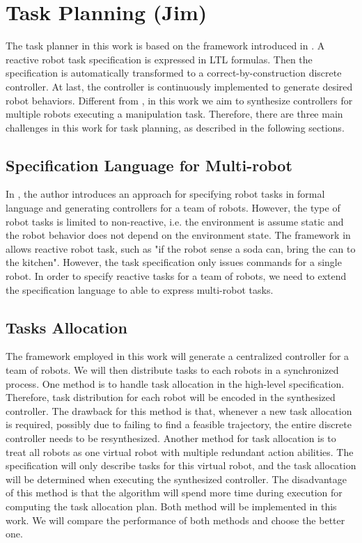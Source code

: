 \section{Task Planning (Jim)}
The task planner in this work is based on the framework introduced in \cite{HKG2009}.
A reactive robot task specification is expressed in LTL formulas.
Then the specification is automatically transformed to a correct-by-construction discrete controller.
At last, the controller is continuously implemented to generate desired robot behaviors.
Different from \cite{HKG2009}, in this work we aim to synthesize controllers for multiple robots executing a manipulation task.
Therefore, there are three main challenges in this work for task planning, as described in the following sections.

\subsection{Specification Language for Multi-robot}
In \cite{ChenDSB12,Diaz-MercadoJBE15}, the author introduces an approach for specifying robot tasks in formal language and generating controllers for a team of robots. 
However, the type of robot tasks is limited to non-reactive, i.e. the environment is assume static and the robot behavior does not depend on the environment state.
The framework in \cite{HKG2009} allows reactive robot task, such as "if the robot sense a soda can, bring the can to the kitchen".
However, the task specification only issues commands for a single robot.
In order to specify reactive tasks for a team of robots, we need to extend the specification language to able to express  multi-robot tasks.

\subsection{Tasks Allocation}
The framework employed in this work will generate a centralized controller for a team of robots.
We will then distribute tasks to each robots in a synchronized process.
One method is to handle task allocation in the high-level specification.
Therefore, task distribution for each robot will be encoded in the synthesized controller.
The drawback for this method is that, whenever a new task allocation is required,
possibly due to failing to find a feasible trajectory, the entire discrete controller needs to be resynthesized.
Another method for task allocation is to treat all robots as one virtual robot with multiple redundant action abilities.
The specification will only describe tasks for this virtual robot,
and the task allocation will be determined when executing the synthesized controller.
The disadvantage of this method is that the algorithm will spend more time during execution for computing the task allocation plan.
Both method will be implemented in this work.
We will compare the performance of both methods and choose the better one.

